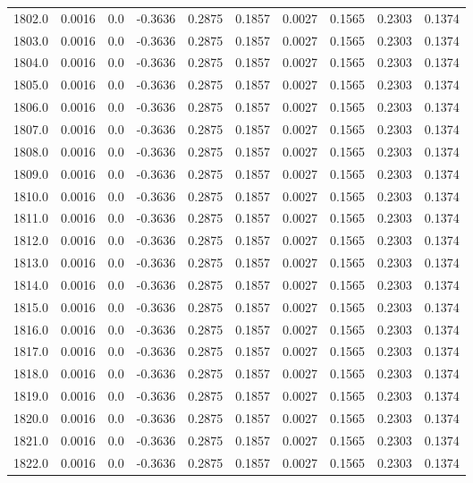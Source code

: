 \begin{longtable}{lrrrrrrrrr}
1802.0 & 0.0016 & 0.0 & -0.3636 & 0.2875 & 0.1857 & 0.0027 & 0.1565 & 0.2303 & 0.1374 \\
1803.0 & 0.0016 & 0.0 & -0.3636 & 0.2875 & 0.1857 & 0.0027 & 0.1565 & 0.2303 & 0.1374 \\
1804.0 & 0.0016 & 0.0 & -0.3636 & 0.2875 & 0.1857 & 0.0027 & 0.1565 & 0.2303 & 0.1374 \\
1805.0 & 0.0016 & 0.0 & -0.3636 & 0.2875 & 0.1857 & 0.0027 & 0.1565 & 0.2303 & 0.1374 \\
1806.0 & 0.0016 & 0.0 & -0.3636 & 0.2875 & 0.1857 & 0.0027 & 0.1565 & 0.2303 & 0.1374 \\
1807.0 & 0.0016 & 0.0 & -0.3636 & 0.2875 & 0.1857 & 0.0027 & 0.1565 & 0.2303 & 0.1374 \\
1808.0 & 0.0016 & 0.0 & -0.3636 & 0.2875 & 0.1857 & 0.0027 & 0.1565 & 0.2303 & 0.1374 \\
1809.0 & 0.0016 & 0.0 & -0.3636 & 0.2875 & 0.1857 & 0.0027 & 0.1565 & 0.2303 & 0.1374 \\
1810.0 & 0.0016 & 0.0 & -0.3636 & 0.2875 & 0.1857 & 0.0027 & 0.1565 & 0.2303 & 0.1374 \\
1811.0 & 0.0016 & 0.0 & -0.3636 & 0.2875 & 0.1857 & 0.0027 & 0.1565 & 0.2303 & 0.1374 \\
1812.0 & 0.0016 & 0.0 & -0.3636 & 0.2875 & 0.1857 & 0.0027 & 0.1565 & 0.2303 & 0.1374 \\
1813.0 & 0.0016 & 0.0 & -0.3636 & 0.2875 & 0.1857 & 0.0027 & 0.1565 & 0.2303 & 0.1374 \\
1814.0 & 0.0016 & 0.0 & -0.3636 & 0.2875 & 0.1857 & 0.0027 & 0.1565 & 0.2303 & 0.1374 \\
1815.0 & 0.0016 & 0.0 & -0.3636 & 0.2875 & 0.1857 & 0.0027 & 0.1565 & 0.2303 & 0.1374 \\
1816.0 & 0.0016 & 0.0 & -0.3636 & 0.2875 & 0.1857 & 0.0027 & 0.1565 & 0.2303 & 0.1374 \\
1817.0 & 0.0016 & 0.0 & -0.3636 & 0.2875 & 0.1857 & 0.0027 & 0.1565 & 0.2303 & 0.1374 \\
1818.0 & 0.0016 & 0.0 & -0.3636 & 0.2875 & 0.1857 & 0.0027 & 0.1565 & 0.2303 & 0.1374 \\
1819.0 & 0.0016 & 0.0 & -0.3636 & 0.2875 & 0.1857 & 0.0027 & 0.1565 & 0.2303 & 0.1374 \\
1820.0 & 0.0016 & 0.0 & -0.3636 & 0.2875 & 0.1857 & 0.0027 & 0.1565 & 0.2303 & 0.1374 \\
1821.0 & 0.0016 & 0.0 & -0.3636 & 0.2875 & 0.1857 & 0.0027 & 0.1565 & 0.2303 & 0.1374 \\
1822.0 & 0.0016 & 0.0 & -0.3636 & 0.2875 & 0.1857 & 0.0027 & 0.1565 & 0.2303 & 0.1374 \\

\end{longtable}
